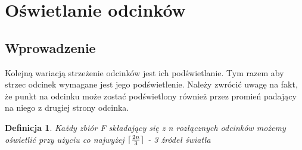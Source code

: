 \documentclass[brudnopis]{xmgr}
\DeclarePairedDelimiter\ceil{\lceil}{\rceil}
\newtheorem{Definicja}{Definicja}
\begin{document}
\section{Oświetlanie odcinków}\label{oświetlanie odcinków}
\subsection{Wprowadzenie}
Kolejną wariacją strzeżenie odcinków jest ich podświetlanie. Tym razem aby strzec odcinek wymagane jest jego podświetlenie. Należy zwrócić uwagę na fakt, że punkt na odcinku może zostać podświetlony również przez promień padający na niego z drugiej strony odcinka.

\begin{Definicja}
 Każdy zbiór F składający się z n rozłącznych odcinków możemy oświetlić przy użyciu co najwyżej $\ceil{\frac{2n}{3}}$ - 3 źródeł światła
\end{Definicja}
\end{document}
